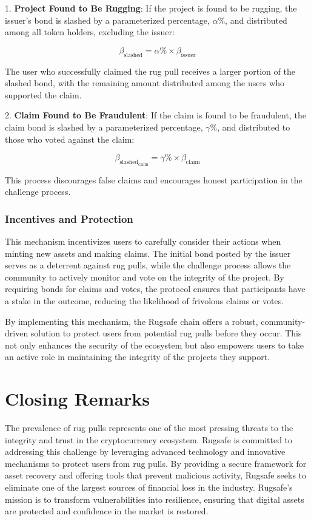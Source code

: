\documentclass{article}
\begin{document}
1. \textbf{Project Found to Be Rugging}: If the project is found to be rugging, the issuer's bond is slashed by a parameterized percentage, \(\alpha\%\), and distributed among all token holders, excluding the issuer:

\[
\beta_{\text{slashed}} = \alpha\% \times \beta_{\text{issuer}}
\]

The user who successfully claimed the rug pull receives a larger portion of the slashed bond, with the remaining amount distributed among the users who supported the claim.

2. \textbf{Claim Found to Be Fraudulent}: If the claim is found to be fraudulent, the claim bond is slashed by a parameterized percentage, \(\gamma\%\), and distributed to those who voted against the claim:

\[
\beta_{\text{slashed}_{\text{claim}}} = \gamma\% \times \beta_{\text{claim}}
\]

This process discourages false claims and encourages honest participation in the challenge process.

\subsubsection{Incentives and Protection}

This mechanism incentivizes users to carefully consider their actions when minting new assets and making claims. The initial bond posted by the issuer serves as a deterrent against rug pulls, while the challenge process allows the community to actively monitor and vote on the integrity of the project. By requiring bonds for claims and votes, the protocol ensures that participants have a stake in the outcome, reducing the likelihood of frivolous claims or votes.

By implementing this mechanism, the Rugsafe chain offers a robust, community-driven solution to protect users from potential rug pulls before they occur. This not only enhances the security of the ecosystem but also empowers users to take an active role in maintaining the integrity of the projects they support.















\section{Closing Remarks}
The prevalence of rug pulls represents one of the most pressing threats to the integrity and trust in the cryptocurrency ecosystem. Rugsafe is committed to addressing this challenge by leveraging advanced technology and innovative mechanisms to protect users from rug pulls. By providing a secure framework for asset recovery and offering tools that prevent malicious activity, Rugsafe seeks to eliminate one of the largest sources of financial loss in the industry. Rugsafe’s mission is to transform vulnerabilities into resilience, ensuring that digital assets are protected and confidence in the market is restored.
\end{document}
